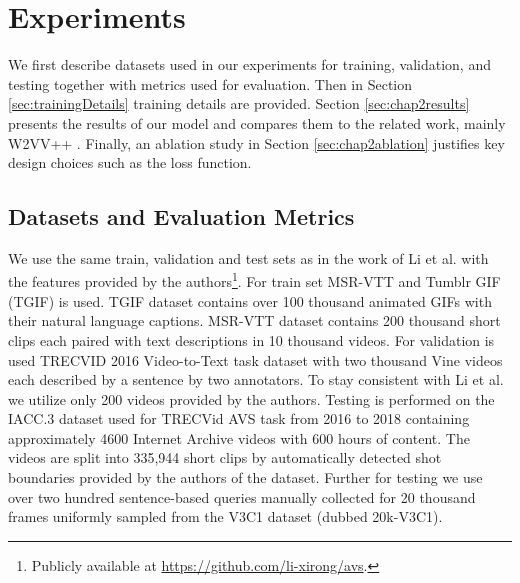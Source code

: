 \clearpage
\section{Experiments}\label{sec:chap2experiments}
We first describe datasets used in our experiments for training, validation, and testing together with metrics used for evaluation. Then in Section \ref{sec:trainingDetails} training details are provided. Section \ref{sec:chap2results} presents the results of our model and compares them to the related work, mainly W2VV++ \cite{XirongW2VVpp}. Finally, an ablation study in Section \ref{sec:chap2ablation} justifies key design choices such as the loss function.

\subsection{Datasets and Evaluation Metrics}
We use the same train, validation and test sets as in the work of Li et al. with the features provided by the authors\footnote{\label{note:1}Publicly available at \url{https://github.com/li-xirong/avs}.}. For train set MSR-VTT \cite{Xu_2016_CVPR} and Tumblr GIF (TGIF) \cite{Li_2016_CVPR} is used. TGIF dataset contains over 100 thousand animated GIFs with their natural language captions. MSR-VTT dataset contains 200 thousand short clips each paired with text descriptions in 10 thousand videos.
For validation is used TRECVID 2016 Video-to-Text task dataset \cite{awad2016trecvid} with two thousand Vine videos each described by a sentence by two annotators. To stay consistent with Li et al. we utilize only 200 videos provided by the authors.
Testing is performed on the IACC.3 dataset \cite{2017trecvidawad} used for TRECVid AVS task from 2016 to 2018 containing approximately 4600 Internet Archive videos with 600 hours of content. The videos are split into 335,944 short clips by automatically detected shot boundaries provided by the authors of the dataset.
Further for testing we use over two hundred sentence-based queries manually collected for 20 thousand frames uniformly sampled from the V3C1 dataset (dubbed 20k-V3C1).

